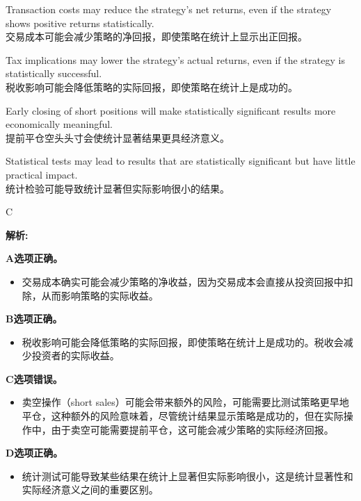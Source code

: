 \documentclass{article}
\newenvironment{explanation}
{\textbf{解析:}\par}
{\par}
\begin{document}
\begin{choices}
    \item Transaction costs may reduce the strategy's net returns, even if the strategy shows positive returns statistically.\\
    交易成本可能会减少策略的净回报，即使策略在统计上显示出正回报。
    \item Tax implications may lower the strategy's actual returns, even if the strategy is statistically successful.\\
    税收影响可能会降低策略的实际回报，即使策略在统计上是成功的。
    \item Early closing of short positions will make statistically significant results more economically meaningful.\\
    提前平仓空头头寸会使统计显著结果更具经济意义。
    \item Statistical tests may lead to results that are statistically significant but have little practical impact.\\
    统计检验可能导致统计显著但实际影响很小的结果。
\end{choices}
\begin{correctanswer}
C
\end{correctanswer}

\begin{explanation}
\textbf{A选项正确。}
\begin{itemize}
    \item 交易成本确实可能会减少策略的净收益，因为交易成本会直接从投资回报中扣除，从而影响策略的实际收益。
\end{itemize}

\textbf{B选项正确。}
\begin{itemize}
    \item 税收影响可能会降低策略的实际回报，即使策略在统计上是成功的。税收会减少投资者的实际收益。
\end{itemize}

\textbf{C选项错误。}
\begin{itemize}
    \item 卖空操作（short sales）可能会带来额外的风险，可能需要比测试策略更早地平仓，这种额外的风险意味着，尽管统计结果显示策略是成功的，但在实际操作中，由于卖空可能需要提前平仓，这可能会减少策略的实际经济回报。
\end{itemize}

\textbf{D选项正确。}
\begin{itemize}
    \item 统计测试可能导致某些结果在统计上显著但实际影响很小，这是统计显著性和实际经济意义之间的重要区别。
\end{itemize}
\end{explanation}
\end{document}
